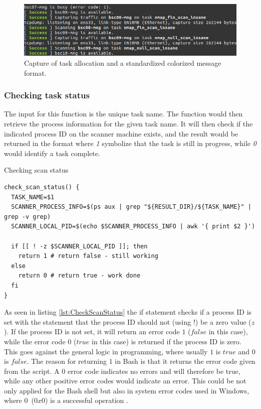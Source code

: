 \begin{figure}[htbp]
\centerline{\includegraphics[scale=0.6]{images/lab/taskissuing.png}}
\caption{Capture of task allocation and a standardized colorized message format.}
\label{fig:LabTaskAllocation}
\end{figure}





\subsubsection{Checking task status}
\label{ss:CheckTaskStatus}
The input for this function is the unique task name.
The function would then retrieve the process information for the given task name.
It will then check if the indicated process ID on the scanner machine exists, and the result would be returned in the format where \textit{1} symbolize that the task is still in progress, while \textit{0} would identify a task complete.

\begin{listing}[!ht]
\caption{Checking scan status}
\label{lst:CheckScanStatus}
\begin{verbatim}
check_scan_status() {
  TASK_NAME=$1
  SCANNER_PROCESS_INFO=$(ps aux | grep "${RESULT_DIR}/${TASK_NAME}" | grep -v grep)
  SCANNER_LOCAL_PID=$(echo $SCANNER_PROCESS_INFO | awk '{ print $2 }')

  if [[ ! -z $SCANNER_LOCAL_PID ]]; then
    return 1 # return false - still working
  else
    return 0 # return true - work done
  fi
}
\end{verbatim}
\end{listing}

As seen in listing \ref{lst:CheckScanStatus} the if statement checks if a process ID is set with the statement that the process ID should not (using $!$) be a zero value ($z$).
If the process ID is not set, it will return an error code $1$ ($false$ in this case), while the error code $0$ ($true$ in this case) is returned if the process ID is zero.
This goes against the general logic in programming, where usually $1$ is $true$ and $0$ is $false$.
The reason for returning $1$ in Bash is that it returns the error code given from the script. A $0$ error code indicates no errors and will therefore be true, while any other positive error codes would indicate an error.
This could be not only applied for the Bash shell but also in system error codes used in Windows, where $0$ ($0x0$) is a successful operation \autocite{MicrosoftErrorCode}.


